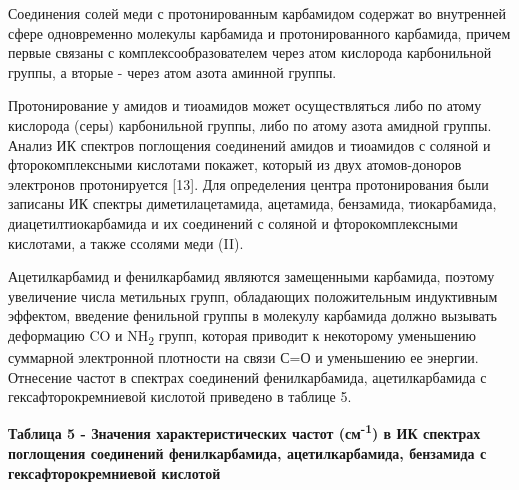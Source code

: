 Соединения солей меди с протонированным карбамидом содержат во
внутренней сфере одновременно молекулы карбамида и протонированного
карбамида, причем первые связаны с комплексообразователем через атом
кислорода карбонильной группы, а вторые - через атом азота аминной
группы.

Протонирование у амидов и тиоамидов может осуществляться либо по атому
кислорода (серы) карбонильной группы, либо по атому азота амидной
группы. Анализ ИК спектров поглощения соединений амидов и тиоамидов с
соляной и фторокомплексными кислотами покажет, который из двух
атомов-доноров электронов протонируется {[}13{]}. Для определения центра
протонирования были записаны ИК спектры диметилацетамида, ацетамида,
бензамида, тиокарбамида, диацетилтиокарбамида и их соединений с соляной
и фторокомплексными кислотами, а также ссолями меди (II).

Ацетилкарбамид и фенилкарбамид являются замещенными карбамида, поэтому
увеличение числа метильных групп, обладающих положительным индуктивным
эффектом, введение фенильной группы в молекулу карбамида должно вызывать
деформацию CO и NH\textsubscript{2} групп, которая приводит к некоторому
уменьшению суммарной электронной плотности на связи С=О и уменьшению ее
энергии. Отнесение частот в спектрах соединений фенилкарбамида,
ацетилкарбамида с гексафторокремниевой кислотой приведено в таблице 5.

{\bfseries Таблица 5 - Значения характеристических частот
(см\textsuperscript{-1}) в ИК спектрах поглощения соединений
фенилкарбамида, ацетилкарбамида, бензамида с гексафторокремниевой
кислотой}

